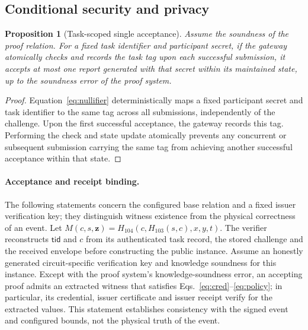 \documentclass[pdflatex,iicol,sn-mathphys-num]{sn-jnl}
\newtheorem{proposition}{Proposition}
\begin{document}
\subsection{Conditional security and privacy}
\label{sec:interpretation}

\begin{proposition}[Task-scoped single acceptance]
Assume the soundness of the proof relation. For a fixed task identifier and participant secret, if the gateway atomically checks and records the task tag upon each successful submission, it accepts at most one report generated with that secret within its maintained state, up to the soundness error of the proof system.
\end{proposition}
\begin{proof}
Equation~\eqref{eq:nullifier} deterministically maps a fixed participant secret and task identifier to the same tag across all submissions, independently of the challenge. Upon the first successful acceptance, the gateway records this tag. Performing the check and state update atomically prevents any concurrent or subsequent submission carrying the same tag from achieving another successful acceptance within that state.
\end{proof}


\paragraph{Acceptance and receipt binding.} The following statements concern the configured base relation and a fixed issuer verification key; they distinguish witness existence from the physical correctness of an event. Let $M(c,s,\boldsymbol z)=H_{104}(c,H_{103}(s,c),x,y,t)$. The verifier reconstructs $\mathsf{tid}$ and $c$ from its authenticated task record, the stored challenge and the received envelope before constructing the public instance. Assume an honestly generated circuit-specific verification key and knowledge soundness for this instance. Except with the proof system's knowledge-soundness error, an accepting proof admits an extracted witness that satisfies Eqs.~\eqref{eq:cred}--\eqref{eq:policy}; in particular, its credential, issuer certificate and issuer receipt verify for the extracted values. This statement establishes consistency with the signed event and configured bounds, not the physical truth of the event.
\end{document}
